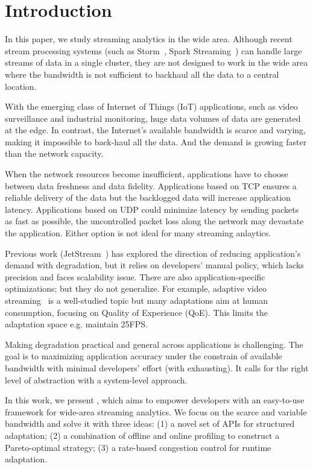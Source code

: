 \section{Introduction}

In this paper, we study streaming analytics in the wide area. Although recent
stream processing systems (such as Storm~\cite{toshniwal2014storm}, Spark
Streaming~\cite{zaharia2013discretized}) can handle large streams of data in a
single cluster, they are not designed to work in the wide area where the
bandwidth is not sufficient to backhaul all the data to a central location.

With the emerging class of Internet of Things (IoT) applications, such as video
surveillance and industrial monitoring, huge data volumes of data are generated
at the edge. In contrast, the Internet's available bandwidth is scarce and
varying, making it impossible to back-haul all the data. And the demand is
growing faster than the network capacity.

When the network resources become insufficient, applications have to choose
between data freshness and data fidelity. Applications based on TCP ensures a
reliable delivery of the data but the backlogged data will increase application
latency. Applications based on UDP could minimize latency by sending packets as
fast as possible, the uncontrolled packet loss along the network may devastate
the application. Either option is not ideal for many streaming anlaytics.

Previous work (JetStream~\cite{rabkin2014aggregation}) has explored the
direction of reducing application's demand with degradation, but it relies on
developers' manual policy, which lacks precision and faces scalability issue.
There are also application-specific optimizations; but they do not
generalize. For example, adaptive video streaming~\cite{yin2015control} is a
well-studied topic but many adaptations aim at human consumption, focusing on
Quality of Experience (QoE). This limits the adaptation space e.g. maintain
25FPS.

Making degradation practical and general across applications is challenging. The
goal is to maximizing application accuracy under the constrain of available
bandwidth with minimal developers' effort (with exhausting). It calls for the
right level of abstraction with a system-level approach.

In this work, we present \sysname{}, which aims to empower developers with an
easy-to-use framework for wide-area streaming analytics. We focus on the scarce
and variable bandwidth and solve it with three ideas: (1) a novel set of APIs
for structured adaptation; (2) a combination of offline and online profiling to
construct a Pareto-optimal strategy; (3) a rate-based congestion control for
runtime adaptation.

